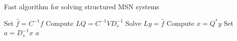 \begin{algorithm}
\caption{Fast algorithm for solving structured MSN systems}
\label{alg:general_lq_solution}
\begin{algorithmic}[1]
    \State Set $\hat{f} = C^{-1}f$
    \State Compute $LQ = C^{-1}VD_{s}^{-1}$
    \State Solve $Ly = \hat{f}$
    \State Compute $x = Q^{*}y$
    \State Set $a = D_{s}^{-1}x$
    \State \Return $a$
\EndFunction
\end{algorithmic}
\end{algorithm}
